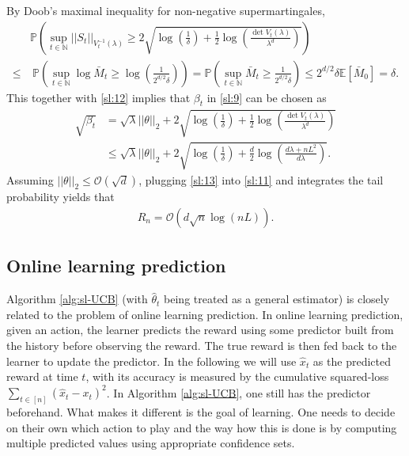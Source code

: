 \documentclass[letterpaper,10pt,openright,openany]{book}
\numberwithin{equation}{section}
\theoremstyle{plain}
\theoremstyle{definition}
\def\N{{\mathbb N}}
\def\E{{\mathbb E}}
\def\P{{\mathbb P}}
\def\t{{\theta}}
\begin{document}
By Doob's maximal inequality for non-negative supermartingales, 
\begin{align*}
&\P\left(\sup_{t\in\N}||S_t||_{V^{-1}_t(\lambda)}\geq 2\sqrt{\log\left(\frac{1}{\delta}\right)+\frac{1}{2}\log\left(\frac{\det V_t(\lambda)}{\lambda^d}\right)}\right)\\
\leq&\ \P\left(\sup_{t\in\N}\log\bar{M}_t\geq\log\left(\frac{1}{2^{d/2}\delta}\right)\right) = \P\left(\sup_{t\in\N}\bar{M}_t\geq \frac{1}{2^{d/2}\delta}\right)\leq 2^{d/2}\delta\E[\bar{M}_0]=\delta. 
\end{align*}
This together with \eqref{sl:12} implies that $\beta_t$ in \eqref{sl:9} can be chosen as 
\begin{align}
\sqrt{\beta_t} &= \sqrt{\lambda}||\t||_2+2\sqrt{\log\left(\frac{1}{\delta}\right)+\frac{1}{2}\log\left(\frac{\det V_t(\lambda)}{\lambda^d}\right)}\nonumber\\
&\leq\sqrt{\lambda}||\t||_2+2\sqrt{\log\left(\frac{1}{\delta}\right)+\frac{d}{2}\log\left(\frac{d\lambda+nL^2}{d\lambda}\right)}\label{sl:13}.
\end{align}
Assuming $||\t||_2\leq\mathcal O(\sqrt{d})$, plugging \eqref{sl:13} into \eqref{sl:11} and integrates the tail probability yields that 
\begin{align*}
R_n = \mathcal O \left(d\sqrt{n}\log (nL)\right).
\end{align*}

\subsection{Online learning prediction}\label{sec:olp}

Algorithm \ref{alg:sl-UCB} (with $\hat{\t}_t$ being treated as a general estimator) is closely related to the problem of online learning prediction. 
In online learning prediction, given an action, the learner predicts the reward using some predictor built from the history before observing the reward. 
The true reward is then fed back to the learner to update the predictor. 
In the following we will use $\hat{x}_t$ as the predicted reward at time $t$, with its accuracy is measured by the cumulative squared-loss $\sum_{t\in [n]}(\hat{x}_t-x_t)^2$. 
In Algorithm \ref{alg:sl-UCB}, one still has the predictor beforehand. What makes it different is the goal of learning. One needs to decide on their own which action to play and the way how this is done is by computing multiple predicted values using appropriate confidence sets. 
\end{document}
